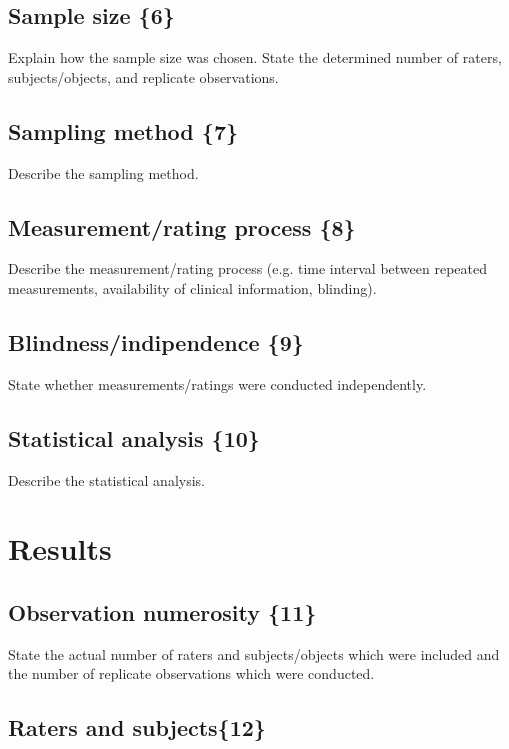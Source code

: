 \subsection{Sample size \{6\}}

Explain how the sample size was chosen. State the determined number of
raters, subjects/objects, and replicate observations.

\subsection{Sampling method \{7\}}

Describe the sampling method.

\subsection{Measurement/rating process \{8\}}

Describe the measurement/rating process (e.g. time interval between
repeated measurements, availability of clinical information,
blinding).

\subsection{Blindness/indipendence \{9\}}

State whether measurements/ratings were conducted independently.

\subsection{Statistical analysis \{10\}}

Describe the statistical analysis.

\section{Results}

\subsection{Observation numerosity \{11\}}

State the actual number of raters and subjects/objects which were
included and the number of replicate observations which were
conducted.

\subsection{Raters and subjects\{12\}}


